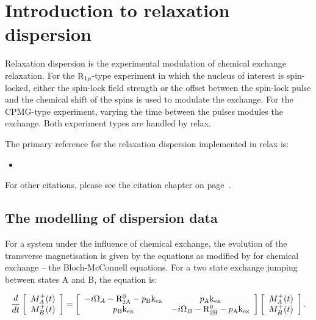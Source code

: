 
\section{Introduction to relaxation dispersion}

Relaxation dispersion is the experimental modulation of chemical exchange relaxation.
For the $\mathrm{R}_{1\rho}$-type experiment in which the nucleus of interest is spin-locked, either the spin-lock field strength or the offset between the spin-lock pulse and the chemical shift of the spins is used to modulate the exchange.
For the CPMG-type experiment, varying the time between the pulses modules the exchange.
Both experiment types are handled by relax.

The primary reference for the relaxation dispersion implemented in relax is:
\begin{itemize}
  \item {}
\end{itemize}

For other citations, please see the citation chapter on page~\pageref{ch: citations}.



\subsection{The modelling of dispersion data}

For a system under the influence of chemical exchange, the evolution of the transverse magnetisation is given by the \citet{Bloch46} equations as modified by \citet{McConnell58} for chemical exchange -- the Bloch-McConnell equations.
For a two state exchange jumping between states A and B, the equation is:

\begin{equation} \label{eq: Bloch-McConnell}
    \frac{d}{dt} \left[ 
        \begin{array}{c}
            M_A^+(t) \\
            M_B^+(t)
        \end{array}
    \right] = \left[
        \begin{array}{cc}
            -i\Omega_A-\mathrm{R}_{\mathrm{2A}}^0-p_{\textrm{B}}\textrm{k}_{\textrm{ex}} & p_{\textrm{A}}\textrm{k}_{\textrm{ex}} \\
            p_{\textrm{B}}\textrm{k}_{\textrm{ex}} & -i\Omega_B-\mathrm{R}_{\mathrm{2B}}^0-p_{\textrm{A}}\textrm{k}_{\textrm{ex}} \\
        \end{array}
    \right] \left[
        \begin{array}{c}
            M_A^+(t) \\
            M_B^+(t)
        \end{array}
    \right] .
\end{equation}

